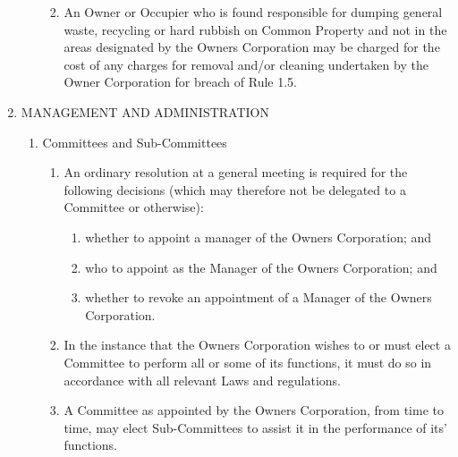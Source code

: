 \documentclass{article}
\begin{document}
\begin{enumerate}[label=\arabic*.]
\begin{enumerate}[label=\arabic{enumi}.\arabic*.]
\begin{enumerate}[label=(\arabic*)]
\begin{enumerate}[label=(\alph*)]
\end{enumerate}

\item  An Owner or Occupier who is found responsible for dumping general waste, recycling or hard rubbish on Common Property and not in the areas designated by the Owners Corporation may be charged for the cost of any charges for removal and/or cleaning undertaken by the Owner Corporation for breach of Rule 1.5.
\newpage



\end{enumerate}

\end{enumerate}

\item  MANAGEMENT AND ADMINISTRATION

\begin{enumerate}[label=\arabic{enumi}.\arabic*.]

\item  Committees and Sub-Committees

\begin{enumerate}[label=(\arabic*)]

\item  An ordinary resolution at a general meeting is required for the following decisions (which may therefore not be delegated to a Committee or otherwise):

\begin{enumerate}[label=(\alph*)]

\item  whether to appoint a manager of the Owners Corporation; and

\item  who to appoint as the Manager of the Owners Corporation; and

\item  whether to revoke an appointment of a Manager of the Owners Corporation.

\end{enumerate}

\item  In the instance that the Owners Corporation wishes to or must elect a Committee to perform all or some of its functions, it must do so in accordance with all relevant Laws and regulations.

\item  A Committee as appointed by the Owners Corporation, from time to time, may elect Sub-Committees to assist it in the performance of its’ functions.


\end{enumerate}
\end{enumerate}
\end{enumerate}
\end{document}
